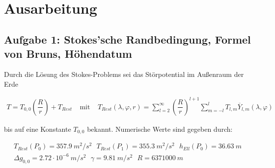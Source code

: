 \chapter*{Ausarbeitung}

\section*{Aufgabe 1: Stokes'sche Randbedingung, Formel von Bruns, Höhendatum}

Durch die Lösung des Stokes-Problems sei das Störpotential im Außenraum der Erde 

\begin{align}
T = T_{0,0} \left(\dfrac{R}{r}\right) + T_{Rest} ~~~~~ \text{mit} ~~~~~ T_{Rest}(\lambda,\varphi,r) = \sum_{l=2}^{\infty} \left(\dfrac{R}{r}\right)^{l+1} \sum_{m=-l}^{l} T_{l,m} \overline{Y}_{l,m}(\lambda,\varphi)
\end{align}

bis auf eine Konstante $T_{0,0}$ bekannt. Numerische Werte sind gegeben durch: 

\begin{gather*}
T_{Rest}(P_0) = 357.9~m^2/s^2 ~~~ T_{Rest}(P_1) = 355.3~m^2/s^2 ~~~ h_{Ell}(P_0) = 36.63~m \\
\Delta g_{0,0} = 2.72 \cdot 10^{-6}~m/s^2 ~~~ \gamma = 9.81~m/s^2 ~~~ R = 6371000~m 
\end{gather*}

